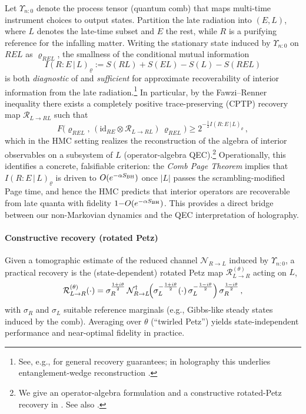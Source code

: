 \documentclass[a4paper,11pt]{article}
\newcommand{\eg}{e.g.\xspace}
\newcommand{\HMC}{\textsc{HMC}\xspace}
\theoremstyle{plain}
\theoremstyle{definition}
\theoremstyle{remark}
\begin{document}
Let $\Upsilon_{n{:}0}$ denote the process tensor (quantum comb) that maps multi-time instrument choices to output states. Partition the late radiation into $(E,L)$, where $L$ denotes the late-time subset and $E$ the rest, while $R$ is a purifying reference for the infalling matter.
Writing the stationary state induced by $\Upsilon_{n{:}0}$ on $REL$ as $\varrho_{REL}$, the smallness of the conditional mutual information
\begin{equation}
I(R{:}E\,|\,L)_{\varrho} := S(RL) + S(EL) - S(L) - S(REL)
\end{equation}
is both \emph{diagnostic} of and \emph{sufficient} for approximate recoverability of interior information from the late radiation.\footnote{See, e.g., \citet{FawziRenner:2015} for general recovery guarantees; in holography this underlies entanglement-wedge reconstruction \cite{ADH:2015}.}
In particular, by the Fawzi--Renner inequality there exists a completely positive trace-preserving (CPTP) recovery map $\mathcal{R}_{L\to RL}$ such that
\begin{equation}
F\bigl(\varrho_{REL},\, (\mathrm{id}_{RE}\otimes \mathcal{R}_{L\to RL})\,\varrho_{REL}\bigr) \geq 2^{-\tfrac12 I(R{:}E\,|\,L)_{\varrho}}\,,
\end{equation}
which in the \HMC{} setting realizes the reconstruction of the algebra of interior observables on a subsystem of $L$ (operator-algebra QEC).\footnote{We give an operator-algebra formulation and a constructive rotated-Petz recovery in . See also \citet{Petz:1986,ADH:2015,Pastawski:2015}.}
Operationally, this identifies a concrete, falsifiable criterion: the \emph{Comb Page Theorem} implies that $I(R{:}E\,|\,L)_{\varrho}$ is driven to $O(e^{-\alpha S_{\rm BH}})$ once $|L|$ passes the scrambling-modified Page time, and hence the \HMC{} predicts that interior operators are recoverable from late quanta with fidelity $1{-}O(e^{-\alpha S_{\rm BH}})$.
This provides a direct bridge between our non-Markovian dynamics and the QEC interpretation of holography.

\paragraph{Constructive recovery (rotated Petz)}
Given a tomographic estimate of the reduced channel $\mathcal{N}_{R\to L}$ induced by $\Upsilon_{n{:}0}$, a practical recovery is the (state-dependent) rotated Petz map $\mathcal{R}^{(\theta)}_{L\to R}$ acting on $L$,
\begin{equation}
\mathcal{R}^{(\theta)}_{L\to R}(\cdot) = \sigma_R^{\frac{1+i\theta}{2}}\, \mathcal{N}_{R\to L}^{\dagger}\!\Bigl(\sigma_L^{-\frac{1+i\theta}{2}}(\cdot)\,\sigma_L^{-\frac{1-i\theta}{2}}\Bigr)\,\sigma_R^{\frac{1-i\theta}{2}}\,,
\end{equation}
with $\sigma_R$ and $\sigma_L$ suitable reference marginals (\eg, Gibbs-like steady states induced by the comb).
Averaging over $\theta$ (``twirled Petz'') yields state-independent performance and near-optimal fidelity in practice.
\end{document}
